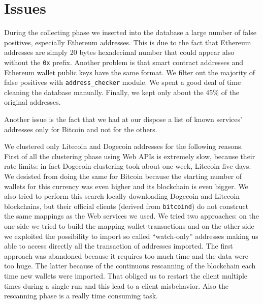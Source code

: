 \section{Issues} \label{sec:issues}
During the collecting phase we inserted into the database a large number of
false positives, especially Ethereum addresses. This is due to the fact that
Ethereum addresses are simply 20 bytes hexadecimal number that could appear
also without the \texttt{0x} prefix. Another problem is that smart contract addresses and Ethereum wallet public keys have the same format. We filter out the majority of false positives with \texttt{address\_checker} module. We spent a good deal of time cleaning the database manually. Finally, we kept only about the 45\% of the original addresses. 

Another issue is the fact that we had at our dispose a list of known services'
addresses only for Bitcoin and not for the others.

We clustered only Litecoin and Dogecoin addresses for the following reasons.
First of all the clustering phase using Web APIs is extremely slow, because their
rate limits: in fact Dogecoin clustering took about one week, Litecoin five days.
We desisted from doing the same for Bitcoin because the starting number of
wallets for this currency was even higher and its blockchain is even bigger. We
also tried to perform this search locally downloading Dogecoin and Litecoin
blockchains, but their official clients (derived from \texttt{bitcoind}) do not
construct the same mappings as the Web services we used. We tried two
approaches: on the one side we tried to build the mapping wallet-transactions
and on the other side we exploited the possibility to import so called
``watch-only'' addresses making us able to access directly all the transaction
of addresses imported. The first approach was abandoned because it
requires too much time and the data were too huge. The latter because of the
continuous rescanning of the blockchain each time new wallets were imported.
That obliged us to restart the client multiple times during a single run and
this lead to a client misbehavior. Also the rescanning phase is a really
time consuming task.

